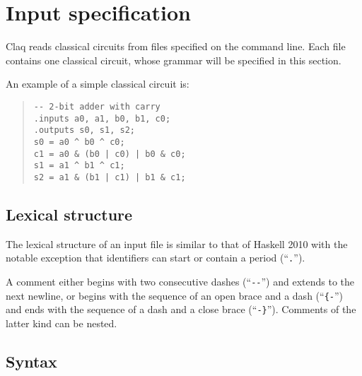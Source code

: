 \documentclass[letterpaper,11pt]{article}
\begin{document}
\section{Input specification} \label{section:input-spec}

Claq reads classical circuits from files specified on the command line.
Each file contains one classical circuit, whose grammar will be specified in this section.

An example of a simple classical circuit is:
\begin{quote}
\begin{verbatim}
-- 2-bit adder with carry
.inputs a0, a1, b0, b1, c0;
.outputs s0, s1, s2;
s0 = a0 ^ b0 ^ c0;
c1 = a0 & (b0 | c0) | b0 & c0;
s1 = a1 ^ b1 ^ c1;
s2 = a1 & (b1 | c1) | b1 & c1;
\end{verbatim}
\end{quote}

\subsection{Lexical structure}

The lexical structure of an input file
is similar to that of Haskell 2010 with the notable exception
that identifiers can start or contain a period (``\verb|.|'').

A comment either begins with two consecutive dashes (``\verb|--|'')
and extends to the next newline,
or begins with the sequence of an open brace and a dash (``\verb|{-|'')
and ends with the sequence of a dash and a close brace (``\verb|-}|'').
Comments of the latter kind can be nested.

\subsection{Syntax}
\end{document}
